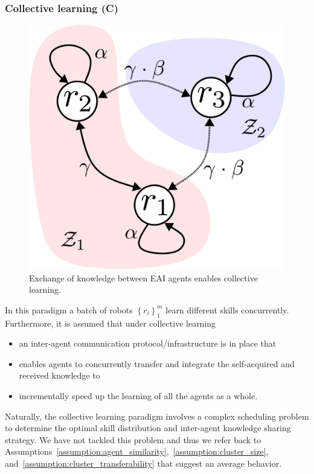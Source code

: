 \subsubsection{\textbf{Collective learning (C)}}
\begin{figure}[!th]
	\centering
	\includegraphics[width=0.7\columnwidth]{fig/cl_example_figure.pdf}
	\caption{Exchange of knowledge between EAI agents enables collective learning.}
	\label{fig:cl_example_figure}
\end{figure}
In this paradigm a batch of robots $\left \lbrace r_i \right \rbrace^m_{1}$ learn different skills concurrently. Furthermore, it is assumed that under collective learning
\begin{itemize}
	\item an inter-agent communication protocol/infrastructure is in place that
	\item enables agents to concurrently transfer and integrate the self-acquired and received knowledge to
	\item incrementally speed up the learning of all the agents as a whole.
\end{itemize}
Naturally, the collective learning paradigm involves a complex scheduling problem to determine the optimal skill distribution and inter-agent knowledge sharing strategy. We have not tackled this problem and thus we refer back to Assumptions~\ref{assumption:agent_similarity},~\ref{assumption:cluster_size}, and~\ref{assumption:cluster_transferability} that suggest an average behavior.

